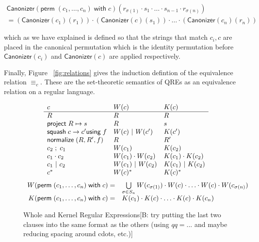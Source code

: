 \documentclass{svproc}
\newcommand{\FINISH}[3]{\ifdraft\textcolor{#1}{[#2: #3]}\fi}
\newcommand{\bcp}[1]{\FINISH{dkred}{B}{#1}}
\newcommand{\kw}[1]{\ensuremath{\mathsf{#1}}}
\newcommand{\project}[2]{\ensuremath{\kw{project} \; #1 \mapsto #2}}
\newcommand{\squash}[3]{\ensuremath{\kw{squash} \; #1 \rightarrow #2
\kw{using} \; #3}}
\newcommand{\perm}[2]{\ensuremath{\kw{perm}\; (#1)\; \kw{with}\; #2}}
\newcommand{\normalize}[3]{\ensuremath{\kw{normalize} \; (#1, #2, #3)}}
\newcommand{\sep}{\ensuremath{\ | \ }}
\newcommand{\canonizer}{\ensuremath{\kw{Canonizer}}}
\newcommand{\eqrel}[1]{\ensuremath{\equiv_{#1}}}
\begin{document}
\begin{align*}\canonizer(\perm{c_1, \ldots, c_n}{c})(r_{\sigma(1)}
\cdot s_1 \cdot \ldots \cdot s_{n-1} \cdot r_{\sigma(n)}) \\
= (\canonizer(c_1)(r_1)) \cdot (\canonizer(c)(s_1)) \cdot \ldots \cdot
(\canonizer(c_n)(r_n))
\end{align*}

\noindent which as we have explained is defined so that the strings that match
$c_i, c$ are placed in the canonical permutation which is the identity
permutation before $\canonizer(c_i)$ and $\canonizer(c)$ are applied
respectively.

Finally, Figure ~\ref{fig:relations} gives the induction defintion of the
equivalence relation $\eqrel{c}$. These are the set-theoretic semantics of QREs
as an equivalence relation on a regular language.

 \begin{figure}[t]
  \centering
  \[
    \begin{array}{l@{\quad}l@{\quad}l}
   
      c & W(c) & K(c) \\ \hline
      R & R & R \\
      \project{R}{s} & R & s \\
      \squash{c}{c'}{f} & W(c) \sep W(c') & K(c') \\
      \normalize{R}{R'}{f} & R & R' \\
      c_2 \; ; \; c_1 & W(c_1) & K(c_2) \\
      c_1 \cdot c_2 & W(c_1) \cdot W(c_2) & K(c_1) \cdot K(c_2) \\
      c_1 \sep c_2 & W(c_1) \sep W(c_2) & K(c_1) \sep K(c_2) \\
      c^* & W(c)^* & K(c)^* \\
    \end{array}
  \]
\[
\begin{array}{r@{\quad}l}
W( \perm{c_1, \ldots, c_n}{c} ) = &
\bigcup \limits_{\sigma \in S_n} W(c_{\sigma(1)}) \cdot W(c) \cdot \ldots \cdot
W(c) \cdot W(c_{\sigma(n)})\\
K( \perm{c_1, \ldots, c_n}{c} ) = & K(c_1) \cdot K(c) \cdot \ldots \cdot K(c)
\cdot K(c_n)
\end{array}
\]
  \caption{Whole and Kernel Regular Expressions\bcp{try putting the 
      last two clauses into the same format as the
      others (using $\mathit{qq} = ...$ and maybe reducing spacing around
      cdots, etc.)}}
  \label{fig:wk}
\end{figure}
\end{document}
